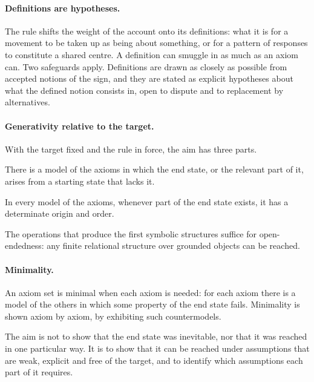 \documentclass[11pt]{article}
\begin{document}
\paragraph{Definitions are hypotheses.}
The rule shifts the weight of the account onto its definitions: what it is for a movement
to be taken up as being about something, or for a pattern of responses to constitute a
shared centre. A definition can smuggle in as much as an axiom can. Two safeguards apply.
Definitions are drawn as closely as possible from accepted notions of the sign, and they
are stated as explicit hypotheses about what the defined notion consists in, open to
dispute and to replacement by alternatives.

\paragraph{Generativity relative to the target.}
With the target fixed and the rule in force, the aim has three parts.
\begin{description}[leftmargin=1.5em, style=nextline]
  \item[Existence.] There is a model of the axioms in which the end state, or the relevant
    part of it, arises from a starting state that lacks it.
  \item[Necessity.] In every model of the axioms, whenever part of the end state exists,
    it has a determinate origin and order.
  \item[Universality.] The operations that produce the first symbolic structures suffice
    for open-endedness: any finite relational structure over grounded objects can be
    reached.
\end{description}

\paragraph{Minimality.}
An axiom set is minimal when each axiom is needed: for each axiom there is a model of the
others in which some property of the end state fails. Minimality is shown axiom by axiom,
by exhibiting such countermodels.

The aim is not to show that the end state was inevitable, nor that it was reached in one
particular way. It is to show that it can be reached under assumptions that are weak,
explicit and free of the target, and to identify which assumptions each part of it
requires.
\end{document}
